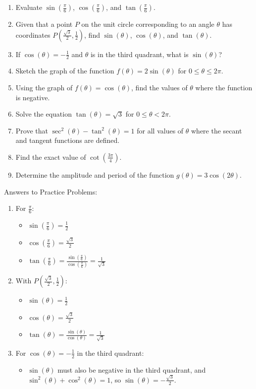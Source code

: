 \documentclass[a4paper,12pt]{book}
\newcounter{problem}
\begin{document}
\begin{enumerate}
  \item Evaluate \(\sin\left(\frac{\pi}{6}\right)\), \(\cos\left(\frac{\pi}{6}\right)\), and \(\tan\left(\frac{\pi}{6}\right)\).
  \item Given that a point \( P \) on the unit circle corresponding to an angle \(\theta\) has coordinates \( P(\frac{\sqrt{3}}{2}, \frac{1}{2}) \), find \(\sin(\theta)\), \(\cos(\theta)\), and \(\tan(\theta)\).
  \item If \(\cos(\theta) = -\frac{1}{2}\) and \(\theta\) is in the third quadrant, what is \(\sin(\theta)\)?
  \item Sketch the graph of the function \( f(\theta) = 2\sin(\theta) \) for \( 0 \leq \theta \leq 2\pi \).
  \item Using the graph of \( f(\theta) = \cos(\theta) \), find the values of \(\theta\) where the function is negative.
  \item Solve the equation \( \tan(\theta) = \sqrt{3} \) for \( 0 \leq \theta < 2\pi \).
  \item Prove that \(\sec^2(\theta) - \tan^2(\theta) = 1\) for all values of \(\theta\) where the secant and tangent functions are defined.
  \item Find the exact value of \(\cot\left(\frac{3\pi}{4}\right)\).
  \item Determine the amplitude and period of the function \( g(\theta) = 3\cos(2\theta) \).
\end{enumerate}

Answers to Practice Problems:

\begin{enumerate}
  \item For \(\frac{\pi}{6}\):
    \begin{itemize}
      \item \(\sin\left(\frac{\pi}{6}\right) = \frac{1}{2}\)
      \item \(\cos\left(\frac{\pi}{6}\right) = \frac{\sqrt{3}}{2}\)
      \item \(\tan\left(\frac{\pi}{6}\right) = \frac{\sin\left(\frac{\pi}{6}\right)}{\cos\left(\frac{\pi}{6}\right)} = \frac{1}{\sqrt{3}}\)
    \end{itemize}
  \item With \( P(\frac{\sqrt{3}}{2}, \frac{1}{2}) \):
    \begin{itemize}
      \item \(\sin(\theta) = \frac{1}{2}\)
      \item \(\cos(\theta) = \frac{\sqrt{3}}{2}\)
      \item \(\tan(\theta) = \frac{\sin(\theta)}{\cos(\theta)} = \frac{1}{\sqrt{3}}\)
    \end{itemize}
  \item For \(\cos(\theta) = -\frac{1}{2}\) in the third quadrant:
    \begin{itemize}
      \item \(\sin(\theta)\) must also be negative in the third quadrant, and \(\sin^2(\theta) + \cos^2(\theta) = 1\), so \(\sin(\theta) = -\frac{\sqrt{3}}{2}\).
    \end{itemize}
\end{enumerate}
\end{document}
